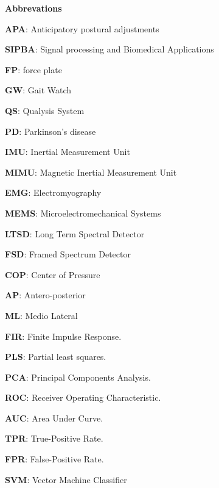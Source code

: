 
\begin{titlepage}
\label{ch:abbrevations}
{ \huge \bfseries Abbrevations \\[0.4cm] }

\textbf{APA}: Anticipatory postural adjustments

\textbf{SIPBA}: Signal processing and Biomedical Applications

\textbf{FP}: force plate

\textbf{GW}: Gait Watch

\textbf{QS}: Qualysis System

\textbf{PD}: Parkinson’s disease

\textbf{IMU}: Inertial Measurement Unit

\textbf{MIMU}: Magnetic Inertial Measurement Unit

\textbf{EMG}: Electromyography

\textbf{MEMS}: Microelectromechanical Systems

\textbf{LTSD}: Long Term Spectral Detector

\textbf{FSD}: Framed Spectrum Detector

\textbf{COP}: Center of Pressure

\textbf{AP}: Antero-posterior

\textbf{ML}: Medio Lateral

\textbf{FIR}: Finite Impulse Response.

\textbf{PLS}: Partial least squares.

\textbf{PCA}: Principal Components Analysis.

\textbf{ROC}: Receiver Operating Characteristic.

\textbf{AUC}: Area Under Curve.

\textbf{TPR}: True-Positive Rate.

\textbf{FPR}: False-Positive Rate.

\textbf{SVM}: Vector Machine Classifier

\end{titlepage} 